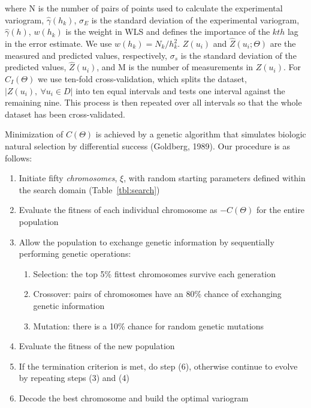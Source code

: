 \documentclass[draft,linenumbers]{agujournal2018}
\begin{document}
where N is the number of pairs of points used to calculate the
experimental variogram, \(\hat{\gamma}(h_k)\), \(\sigma_E\) is the
standard deviation of the experimental variogram, \(\hat{\gamma}(h)\),
\(w(h_k)\) is the weight in WLS and defines the importance of the
\(kth\) lag in the error estimate. We use \(w(h_k) = N_k/h_k^2\).
\(Z(u_i)\) and \(\hat{Z}(u_i; \Theta)\) are the measured and predicted
values, respectively, \(\sigma_s\) is the standard deviation of the
predicted values, \(\hat{Z}(u_i)\), and M is the number of measurements
in \(Z(u_i)\). For \(C_I(\Theta)\) we use ten-fold cross-validation,
which splits the dataset, \(|Z(u_i), ~\forall u_i \in D|\) into ten
equal intervals and tests one interval against the remaining nine. This
process is then repeated over all intervals so that the whole dataset
has been cross-validated.

Minimization of \(C(\Theta)\) is achieved by a genetic algorithm that
simulates biologic natural selection by differential success (Goldberg,
1989). Our procedure is as follows:

\begin{enumerate}
\def\labelenumi{\arabic{enumi}.}
\item
  Initiate fifty \emph{chromosomes}, \(\xi\), with random starting
  parameters defined within the search domain (Table~\ref{tbl:search})
\item
  Evaluate the fitness of each individual chromosome as \(-C(\Theta)\)
  for the entire population
\item
  Allow the population to exchange genetic information by sequentially
  performing genetic operations:

  \begin{enumerate}
  \def\labelenumii{\alph{enumii}.}
  \item
    Selection: the top 5\% fittest chromosomes survive each generation
  \item
    Crossover: pairs of chromosomes have an 80\% chance of exchanging
    genetic information
  \item
    Mutation: there is a 10\% chance for random genetic mutations
  \end{enumerate}
\item
  Evaluate the fitness of the new population
\item
  If the termination criterion is met, do step (6), otherwise continue
  to evolve by repeating steps (3) and (4)
\item
  Decode the best chromosome and build the optimal variogram
\end{enumerate}
\end{document}
